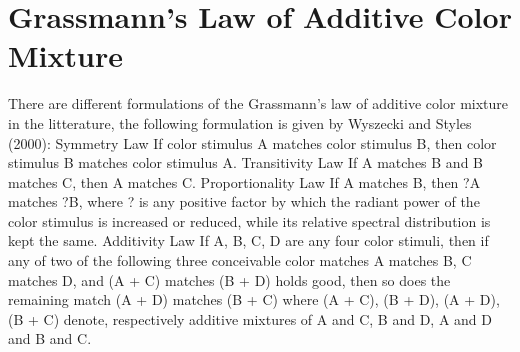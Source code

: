 \section{Grassmann's Law of Additive Color Mixture}%
\label{sec:grassmann-laws-of-additive-color-mixture}

There are different formulations of the Grassmann's law of additive color mixture in the litterature, the following formulation is given by Wyszecki and Styles (2000):
Symmetry Law
If color stimulus A matches color stimulus B, then color stimulus B matches color stimulus A.
Transitivity Law
If A matches B and B matches C, then A matches C.
Proportionality Law
If A matches B, then ?A matches ?B, where ? is any positive factor by which the radiant power of the color stimulus is increased or reduced, while its relative spectral distribution is kept the same.
Additivity Law
If A, B, C, D are any four color stimuli, then if any of two of the following three conceivable color matches A matches B, C matches D, and (A + C) matches (B + D) holds good, then so does the remaining match (A + D) matches (B + C) where (A + C), (B + D), (A + D), (B + C) denote, respectively additive mixtures of A and C, B and D, A and D and B and C.
